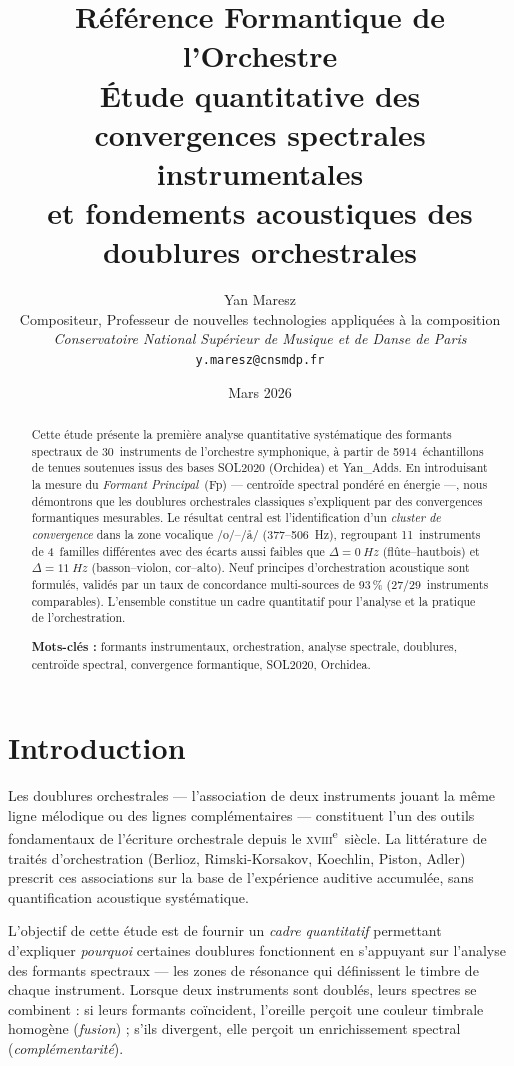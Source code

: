 \documentclass[11pt,a4paper]{article}
\title{%
  \textbf{Référence Formantique de l'Orchestre}\\[6pt]
  \large Étude quantitative des convergences spectrales instrumentales\\
  et fondements acoustiques des doublures orchestrales%
}
\author{%
  Yan Maresz\\
  Compositeur, Professeur de nouvelles technologies appliquées à la composition\\
  \textit{Conservatoire National Supérieur de Musique et de Danse de Paris}\\
  \texttt{y.maresz@cnsmdp.fr}%
}
\date{Mars 2026}
\begin{document}
\maketitle

\begin{abstract}
Cette étude présente la première analyse quantitative systématique des
formants spectraux de 30~instruments de l'orchestre symphonique, à partir
de \num{5914}~échantillons de tenues soutenues issus des bases SOL2020
(Orchidea) et Yan\_Adds. En introduisant la mesure du \emph{Formant
Principal}~(Fp) --- centroïde spectral pondéré en énergie ---, nous
démontrons que les doublures orchestrales classiques s'expliquent par des
convergences formantiques mesurables. Le résultat central est
l'identification d'un \emph{cluster de convergence} dans la zone
vocalique /o/--/\r{a}/ (377--506~Hz), regroupant 11~instruments de
4~familles différentes avec des écarts aussi faibles que $\Delta =
\SI{0}{Hz}$ (flûte--hautbois) et $\Delta = \SI{11}{Hz}$
(basson--violon, cor--alto). Neuf principes d'orchestration acoustique
sont formulés, validés par un taux de concordance multi-sources de
93\,\% (27/29~instruments comparables). L'ensemble constitue un cadre
quantitatif pour l'analyse et la pratique de l'orchestration.

\medskip
\noindent\textbf{Mots-clés :} formants instrumentaux, orchestration,
analyse spectrale, doublures, centroïde spectral, convergence
formantique, SOL2020, Orchidea.
\end{abstract}


\section{Introduction}

Les doublures orchestrales --- l'association de deux instruments jouant
la même ligne mélodique ou des lignes complémentaires --- constituent
l'un des outils fondamentaux de l'écriture orchestrale depuis le
\textsc{xviii}\textsuperscript{e}~siècle. La littérature de traités
d'orchestration (Berlioz, Rimski-Korsakov, Koechlin, Piston, Adler)
prescrit ces associations sur la base de l'expérience auditive
accumulée, sans quantification acoustique systématique.

L'objectif de cette étude est de fournir un \emph{cadre quantitatif}
permettant d'expliquer \emph{pourquoi} certaines doublures fonctionnent
en s'appuyant sur l'analyse des formants spectraux --- les zones de
résonance qui définissent le timbre de chaque instrument. Lorsque deux
instruments sont doublés, leurs spectres se combinent : si leurs
formants coïncident, l'oreille perçoit une couleur timbrale homogène
(\emph{fusion}) ; s'ils divergent, elle perçoit un enrichissement
spectral (\emph{complémentarité}).
\end{document}
